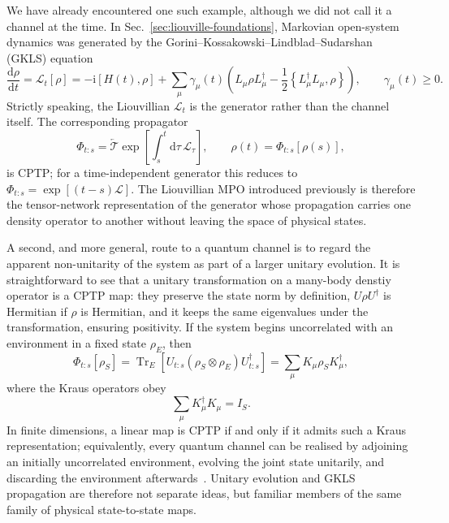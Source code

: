 We have already encountered one such example, although we did not call it a channel at the time.
In Sec.~\ref{sec:liouville-foundations}, Markovian open-system dynamics was generated by the Gorini--Kossakowski--Lindblad--Sudarshan (GKLS) equation
%
\begin{equation}
    \frac{\mathrm d\rho}{\mathrm dt}
    = \mathcal L_t[\rho]
    =
    -\mathrm i[H(t),\rho]
    + \sum_{\mu}\gamma_{\mu}(t) \left(
        L_{\mu}\rho L_{\mu}^{\dagger}
        - \frac{1}{2} \left\{
            L_{\mu}^{\dagger}L_{\mu},\rho \right\} \right), \qquad \gamma_{\mu}(t)\geq0.
    \label{eq:gkls-generator-channel}
\end{equation}
%
Strictly speaking, the Liouvillian \(\mathcal L_t\) is the generator rather than the channel itself.
The corresponding propagator
%
\begin{equation}
    \Phi_{t:s}
    = \overleftarrow{\mathcal T} \exp\!\left[ \int_s^t \mathrm d\tau\,\mathcal L_{\tau} \right], \qquad \rho(t)=\Phi_{t:s}[\rho(s)],
    \label{eq:gkls-propagator-channel}
\end{equation}
%
is CPTP; for a time-independent generator this reduces to \(\Phi_{t:s}=\exp[(t-s)\mathcal L]\).
The Liouvillian MPO introduced previously is therefore the tensor-network representation of the generator whose propagation carries one density operator to another without leaving the space of physical states.

A second, and more general, route to a quantum channel is to regard the apparent non-unitarity of the system as part of a larger unitary evolution.
It is straightforward to see that a unitary transformation on a many-body denstiy operator is a CPTP map: they preserve the state norm by definition, \(U\rho U^\dagger\) is Hermitian if \(\rho\) is Hermitian, and it keeps the same eigenvalues under the transformation, ensuring positivity.
If the system begins uncorrelated with an environment in a fixed state \(\rho_E\), then
%
\begin{equation}
    \Phi_{t:s}[\rho_S]
    = \operatorname{Tr}_E \left[
        U_{t:s} (\rho_S\otimes\rho_E)
        U_{t:s}^{\dagger} \right]
    = \sum_{\mu}
    K_{\mu}\rho_S K_{\mu}^{\dagger},
    \label{eq:channel-dilation-kraus}
\end{equation}
%
where the Kraus operators obey
%
\begin{equation}
    \sum_{\mu}K_{\mu}^{\dagger}K_{\mu}
    =
    I_S.
    \label{eq:kraus-completeness}
\end{equation}
%
In finite dimensions, a linear map is CPTP if and only if it admits such a Kraus representation; equivalently, every quantum channel can be realised by adjoining an initially uncorrelated environment, evolving the joint state unitarily, and discarding the environment afterwards~\cite{Taranto2025}.
Unitary evolution and GKLS propagation are therefore not separate ideas, but familiar members of the same family of physical state-to-state maps.

